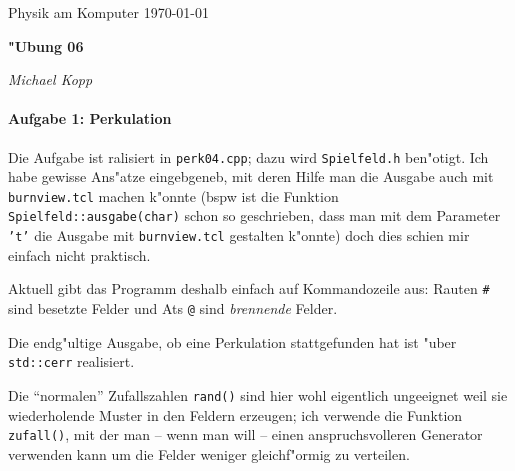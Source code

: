 \documentclass[a4paper,12pt]{article}
\begin{document}
\newcommand{\NAME}{Michael Kopp}
\newcommand{\FACH}{Physik am Komputer}
\newcommand{\TITEL}{"Ubung 06}
\newcommand{\DATUM}{\today}


\pagestyle{plain} 




\sloppy

\begin{center}
\FACH
\hfill
\DATUM
\end{center}

\vspace{-5mm} %

\begin{center}
  \begin{Large}
 \textbf{\TITEL}
  \end{Large}
\end{center}

\vspace{-3mm}

\begin{center}
\hrulefill
\quad 
\textit{\NAME}
\,
\hrulefill
\end{center}
 
 

\noindent


\paragraph{Aufgabe 1: Perkulation}

Die Aufgabe ist ralisiert in \texttt{perk04.cpp}; dazu wird
\texttt{Spielfeld.h} ben"otigt. Ich habe gewisse Ans"atze eingebgeneb, mit
deren Hilfe man die Ausgabe auch mit \texttt{burnview.tcl} machen k"onnte (bspw
ist die Funktion \texttt{Spielfeld::ausgabe(char)} schon so geschrieben, dass
man mit dem Parameter \texttt{'t'} die Ausgabe mit \texttt{burnview.tcl}
gestalten k"onnte) doch dies schien mir einfach nicht praktisch.

Aktuell gibt das Programm deshalb einfach auf Kommandozeile aus: Rauten
\verb+#+ sind besetzte Felder und Ats \verb+@+ sind \textit{brennende} Felder.

Die endg"ultige Ausgabe, ob eine Perkulation stattgefunden hat ist "uber
\texttt{std::cerr} realisiert.

Die "`normalen"' Zufallszahlen \verb+rand()+ sind hier wohl eigentlich
ungeeignet weil sie wiederholende Muster in den Feldern erzeugen; ich verwende
die Funktion \texttt{zufall()}, mit der man -- wenn man will -- einen
anspruchsvolleren Generator verwenden kann um die Felder weniger gleichf"ormig
zu verteilen.
\end{document}
